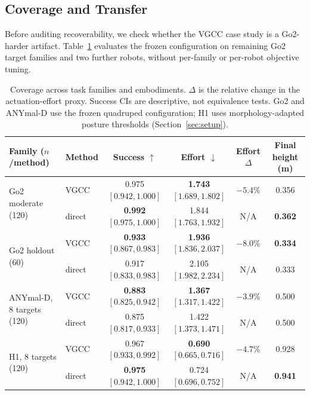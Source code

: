 \documentclass{article}
\begin{document}
\subsection{Coverage and Transfer}
\label{sec:results-coverage}

Before auditing recoverability, we check whether the VGCC case study is a
Go2-harder artifact. Table~\ref{tab:coverage} evaluates the frozen configuration
on remaining Go2 target families and two further robots, without per-family or
per-robot objective tuning.

\begin{table}[t]
\centering
\caption{Coverage across task families and embodiments. $\Delta$ is the relative change in the actuation-effort proxy. Success CIs are descriptive, not equivalence tests. Go2 and ANYmal-D use the frozen quadruped configuration; H1 uses morphology-adapted posture thresholds (Section~\ref{sec:setup}).}
\label{tab:coverage}
\begin{tabular}{llcccc}
\toprule
Family ($n$/method) & Method & Success $\uparrow$ & Effort $\downarrow$ & Effort $\Delta$ & Final height (m) \\
\midrule
\multirow{2}{*}{Go2 moderate (120)}
 & VGCC   & 0.975 {\scriptsize$[0.942, 1.000]$} & \textbf{1.743} {\scriptsize$[1.689, 1.802]$} & $-5.4\%$ & 0.356 \\
 & direct & \textbf{0.992} {\scriptsize$[0.975, 1.000]$} & 1.844 {\scriptsize$[1.763, 1.932]$} & N/A & \textbf{0.362} \\
\midrule
\multirow{2}{*}{Go2 holdout (60)}
 & VGCC   & \textbf{0.933} {\scriptsize$[0.867, 0.983]$} & \textbf{1.936} {\scriptsize$[1.836, 2.037]$} & $-8.0\%$ & \textbf{0.334} \\
 & direct & 0.917 {\scriptsize$[0.833, 0.983]$} & 2.105 {\scriptsize$[1.982, 2.234]$} & N/A & 0.333 \\
\midrule
\multirow{2}{*}{ANYmal-D, 8 targets (120)}
 & VGCC   & \textbf{0.883} {\scriptsize$[0.825, 0.942]$} & \textbf{1.367} {\scriptsize$[1.317, 1.422]$} & $-3.9\%$ & 0.500 \\
 & direct & 0.875 {\scriptsize$[0.817, 0.933]$} & 1.422 {\scriptsize$[1.373, 1.471]$} & N/A & 0.500 \\
\midrule
\multirow{2}{*}{H1, 8 targets (120)}
 & VGCC   & 0.967 {\scriptsize$[0.933, 0.992]$} & \textbf{0.690} {\scriptsize$[0.665, 0.716]$} & $-4.7\%$ & 0.928 \\
 & direct & \textbf{0.975} {\scriptsize$[0.942, 1.000]$} & 0.724 {\scriptsize$[0.696, 0.752]$} & N/A & \textbf{0.941} \\
\bottomrule
\end{tabular}
\end{table}
\end{document}
